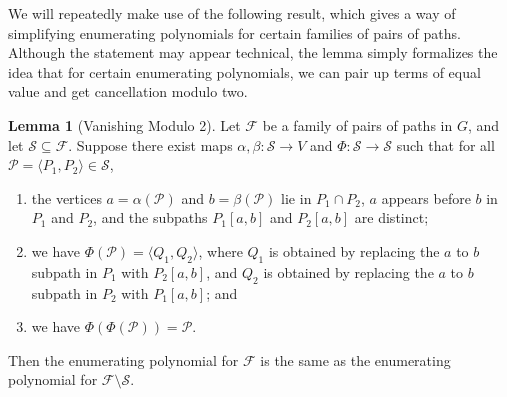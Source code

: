 \documentclass[11pt]{article}
\newcommand{\ca}{\mathcal}
\theoremstyle{definition}
\newtheorem{lemma}[theorem]{Lemma}
\begin{document}
We will repeatedly make use of the following result, which gives a way of simplifying enumerating polynomials for certain families of pairs of paths.
Although the statement may appear technical, the lemma simply formalizes the idea that for certain enumerating polynomials, we can pair up terms of equal value and get cancellation modulo two.

\begin{lemma}[Vanishing Modulo 2]
\label{lem:subpath-swapping-cancels}
    Let $\ca{F}$ be a family of pairs of paths in $G$, and let $\ca{S}\subseteq\ca{F}$.
    Suppose there exist maps $\alpha, \beta: \ca{S}\to V$ and $\Phi: \ca{S}\to \ca{S}$ such that for all $\ca{P} = \langle P_1,P_2\rangle\in\ca{S}$, 
    \begin{enumerate}
        \item the vertices $a = \alpha(\ca{P})$ and $b=\beta(\ca{P})$ lie in $P_1\cap P_2$, $a$ appears before $b$ in $P_1$ and $P_2$, and the subpaths $P_1[a,b]$ and $P_2[a,b]$ are distinct;
        
        \item we have 
        $\Phi(\ca{P}) = \langle Q_1, Q_2\rangle$, where $Q_1$ is obtained by replacing the $a$ to $b$ subpath in $P_1$ with $P_2[a,b]$, and $Q_2$ is obtained by replacing the $a$ to $b$ subpath in $P_2$ with $P_1[a,b]$; and

        \item we have $\Phi(\Phi(\ca{P})) = \ca{P}$.
    \end{enumerate}
    Then the enumerating polynomial for $\ca{F}$ is the same as the enumerating polynomial for $\ca{F}\setminus\ca{S}$.
\end{lemma}
\end{document}

